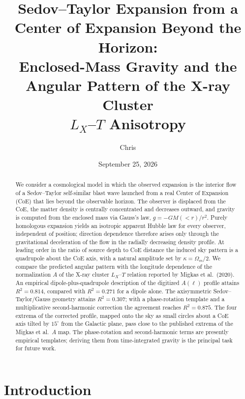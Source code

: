 \documentclass[11pt,letterpaper]{article}
\title{Sedov--Taylor Expansion from a Center of Expansion Beyond the Horizon:\\
Enclosed-Mass Gravity and the Angular Pattern of the X-ray Cluster\\
$L_X$--$T$ Anisotropy}
\author{Chris}
\date{September 25, 2026}
\numberwithin{equation}{section}
\begin{document}
\maketitle

\begin{abstract}
We consider a cosmological model in which the observed expansion is the
interior flow of a Sedov--Taylor self-similar blast wave launched from a real
Center of Expansion (CoE) that lies beyond the observable horizon. The
observer is displaced from the CoE, the matter density is centrally
concentrated and decreases outward, and gravity is computed from the enclosed
mass via Gauss's law, $g=-GM(<r)/r^2$. Purely homologous expansion yields an
isotropic apparent Hubble law for every observer, independent of position;
direction dependence therefore arises only through the gravitational
deceleration of the flow in the radially decreasing density profile. At
leading order in the ratio of source depth to CoE distance the induced sky
pattern is a quadrupole about the CoE axis, with a natural amplitude set by
$\kappa=\Omega_m/2$. We compare the predicted angular pattern with the
longitude dependence of the normalization $A$ of the X-ray cluster $L_X$--$T$
relation reported by Migkas et al.\ (2020). An empirical dipole-plus-quadrupole
description of the digitized $A(\ell)$ profile attains $R^2=0.814$, compared
with $R^2=0.271$ for a dipole alone. The axisymmetric Sedov--Taylor/Gauss
geometry attains $R^2=0.307$; with a phase-rotation template and a
multiplicative second-harmonic correction the agreement reaches $R^2=0.875$.
The four extrema of the corrected profile, mapped onto the sky as small circles
about a CoE axis tilted by $15^\circ$ from the Galactic plane, pass close to
the published extrema of the Migkas et al.\ $A$ map. The phase-rotation and
second-harmonic terms are presently empirical templates; deriving them from
time-integrated gravity is the principal task for future work.
\end{abstract}

\section{Introduction}
\label{sec:intro}
\end{document}
